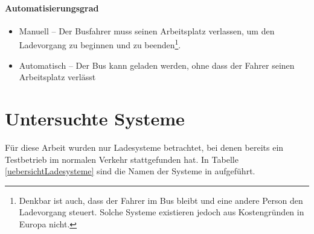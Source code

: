 \paragraph{Automatisierungsgrad}
\begin{itemize}
	\item Manuell – Der Busfahrer muss seinen Arbeitsplatz verlassen, um den Ladevorgang zu beginnen und zu beenden\footnote{Denkbar ist auch, dass der Fahrer im Bus bleibt und eine andere Person den Ladevorgang steuert. Solche Systeme existieren jedoch aus Kostengründen in Europa nicht.}.
	\item Automatisch – Der Bus kann geladen werden, ohne dass der Fahrer seinen Arbeitsplatz verlässt
\end{itemize}

\section{Untersuchte Systeme}
\label{untersuchte_Systeme}
Für diese Arbeit wurden nur Ladesysteme betrachtet, bei denen bereits ein Testbetrieb im normalen Verkehr stattgefunden hat. In Tabelle \ref{uebersichtLadesysteme} sind die Namen der Systeme in aufgeführt. 

